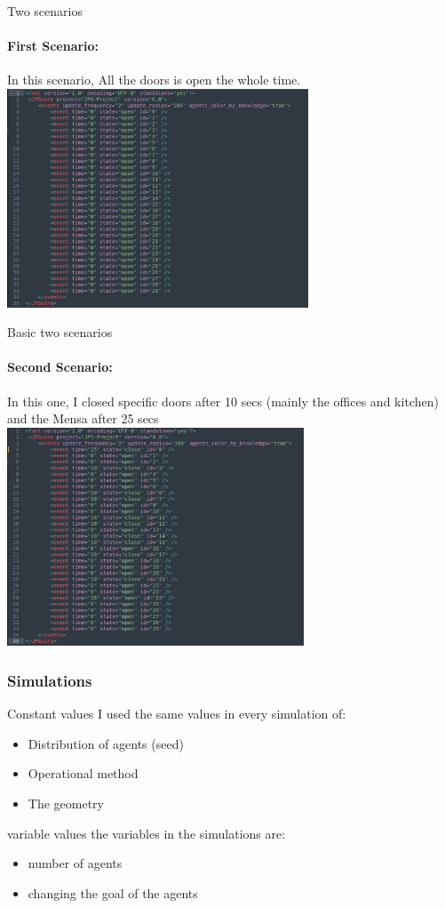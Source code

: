 \documentclass{beamer}
\begin{document}
\begin{frame}{Two scenarios}
  \framesubtitle{First Scenario:}
  In this scenario, All the doors is open the whole time.
  \includegraphics[height=6.5cm]{1st_scenario.png}
\end{frame}

\begin{frame}{Basic two scenarios}
  \framesubtitle{Second Scenario:}
  In this one, I closed specific doors after 10 secs (mainly the offices and kitchen) and the Mensa after 25 secs
  \includegraphics[height=6.5cm]{2nd_scenario.png}
\end{frame}

\begin{frame}
\frametitle{Simulations}
 
\begin{block}{Constant values}
I used the same values in every simulation of:
\begin{itemize}
    \item Distribution of agents (seed)
    \item Operational method
    \item The geometry
\end{itemize}
\end{block}
 
\begin{block}{variable values}
the variables in the simulations are:
\begin{itemize}
    \item number of agents 
    \item changing the goal of the agents
\end{itemize}
\end{block}
\end{frame}
\end{document}
